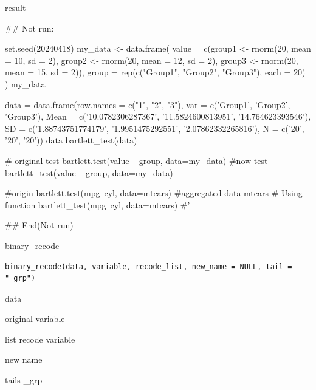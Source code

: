 \documentclass[a4paper]{book}
\begin{document}
%
\begin{Value}
result
\end{Value}
%
\begin{Examples}
\begin{ExampleCode}

\#\# Not run: 

set.seed(20240418)
my_data <- data.frame(
  value = c(group1 <- rnorm(20, mean = 10, sd = 2),
            group2 <- rnorm(20, mean = 12, sd = 2),
            group3 <- rnorm(20, mean = 15, sd = 2)),
  group = rep(c("Group1", "Group2", "Group3"), each = 20)
)
my_data %

data = data.frame(row.names = c("1", "2", "3"),
                  var = c('Group1', 'Group2', 'Group3'),
                  Mean = c('10.0782306287367', '11.5824600813951', '14.764623393546'),
                  SD = c('1.88743751774179', '1.9951475292551', '2.07862332265816'),
                  N = c('20', '20', '20'))
data
bartlett_test(data)

# original test
bartlett.test(value ~ group, data=my_data)
#now test
bartlett_test(value ~ group, data=my_data)


#origin
bartlett.test(mpg~cyl, data=mtcars)
#aggregated data
mtcars%
# Using function
bartlett_test(mpg~cyl, data=mtcars)
#'

## End(Not run)
\end{ExampleCode}
\end{Examples}
%
\begin{Description}
binary\_recode
\end{Description}
%
\begin{Usage}
\begin{verbatim}
binary_recode(data, variable, recode_list, new_name = NULL, tail = "_grp")
\end{verbatim}
\end{Usage}
%
\begin{Arguments}
\begin{ldescription}
\item[\code{data}] data

\item[\code{variable}] original variable

\item[\code{recode\_list}] list recode variable

\item[\code{new\_name}] new name

\item[\code{tail}] tails \_grp
\end{ldescription}
\end{Arguments}
\end{document}
